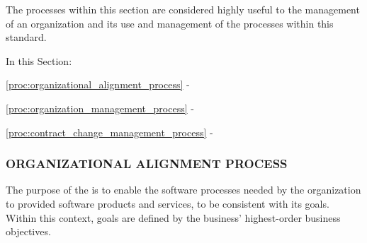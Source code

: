 		\begin{adjustwidth}{1em}{0pt}

			The processes within this section are considered highly useful to the management of an organization and its use and management of the processes within this standard.

			In this Section:

			\begin{compactitem}
			
				\item \ref{proc:organizational_alignment_process} - 

				\item \ref{proc:organization_management_process} - 

				\item \ref{proc:contract_change_management_process} - 
			
			\end{compactitem}

		\end{adjustwidth}

		\newpage
		\subsubsection{ORGANIZATIONAL ALIGNMENT PROCESS\label{proc:organizational_alignment_process}}
		
			\begin{adjustwidth}{2em}{0pt}

				The purpose of the  is to enable the software processes needed by the organization to provided software products and services, to be consistent with its goals. Within this context, goals are defined by the business' highest-order business objectives. 

			\end{adjustwidth}

